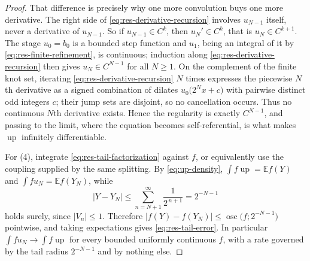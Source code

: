 \documentclass[11pt,oneside]{article}
\theoremstyle{definition}
\theoremstyle{remark}
\newcommand{\Up}{\operatorname{up}}
\newcommand{\E}{\mathbb E}
\begin{document}
\begin{proof}
That difference is precisely why one more convolution buys one more derivative.  The right
side of \eqref{eq:res-derivative-recursion} involves $u_{N-1}$ itself, never a derivative of
$u_{N-1}$.  So if $u_{N-1}\in C^{k}$, then $u_N'\in C^{k}$, that is $u_N\in C^{k+1}$.  The
stage $u_0=b_0$ is a bounded step function and $u_1$, being an integral of it by
\eqref{eq:res-finite-refinement}, is continuous; induction along
\eqref{eq:res-derivative-recursion} then gives $u_N\in C^{N-1}$ for all $N\ge1$.  On the
complement of the finite knot set, iterating \eqref{eq:res-derivative-recursion} $N$ times
expresses the piecewise $N$th derivative as a signed combination of dilates
$u_0\bigl(2^{N}x+c\bigr)$ with pairwise distinct odd integers $c$; their jump sets are
disjoint, so no cancellation occurs.  Thus no continuous $N$th derivative exists.
Hence the regularity is exactly $C^{N-1}$, and passing to the limit, where the equation
becomes self-referential, is what makes $\Up$ infinitely differentiable.

For (4), integrate \eqref{eq:res-tail-factorization} against $f$, or equivalently use the
coupling supplied by the same splitting.  By \eqref{eq:up-density},
$\int f\Up=\E f(Y)$ and $\int fu_N=\E f(Y_N)$, while
\[
 \left|Y-Y_N\right|\le\sum_{n=N+1}^{\infty}\frac1{2^{\,n+1}}=2^{-N-1}
\]
holds surely, since $|V_n|\le1$.  Therefore
$\left|f(Y)-f(Y_N)\right|\le\operatorname{osc}\bigl(f;2^{-N-1}\bigr)$ pointwise, and taking
expectations gives \eqref{eq:res-tail-error}.  In particular
$\int fu_N\to\int f\Up$ for every bounded uniformly continuous $f$, with a rate governed by
the tail radius $2^{-N-1}$ and by nothing else.
\end{proof}
\end{document}
